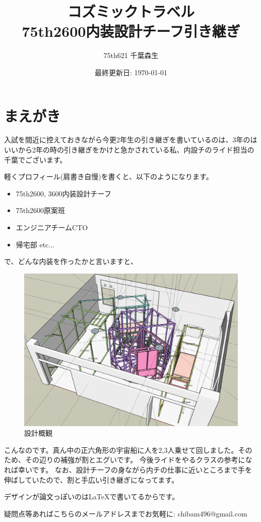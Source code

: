 \documentclass{jsarticle}
\title{
    コズミックトラベル \\
    \large 75th2600内装設計チーフ引き継ぎ
}
\author{75th621 千葉森生}
\date{最終更新日: \today}
\begin{document}
\maketitle

\section{まえがき}

入試を間近に控えておきながら今更2年生の引き継ぎを書いているのは、3年のはいいから2年の時の引き継ぎをかけと急かされている私、内設チのライド担当の千葉でございます。

軽くプロフィール(肩書き自慢)を書くと、以下のようになります。
\begin{itemize}
    \item 75th2600, 3600内装設計チーフ
    \item 75th2600原案班
    \item エンジニアチームCTO
    \item 帰宅部 etc...
\end{itemize}

で、どんな内装を作ったかと言いますと、

\begin{figure}[htbp]
    \centering
    \includegraphics[width=0.5\linewidth]{images/plan_overview/1.png}
    \caption{設計概観}
    \label{fig:設計概観}
\end{figure}

こんなのです。真ん中の正六角形の宇宙船に人を2,3人乗せて回しました。そのため、その辺りの補強が割とエグいです。
今後ライドをやるクラスの参考になれば幸いです。
なお、設計チーフの身ながら内チの仕事に近いところまで手を伸ばしていたので、割と手広い引き継ぎになってます。

デザインが論文っぽいのは\LaTeX{}で書いてるからです。

疑問点等あればこちらのメールアドレスまでお気軽に:  chibam496@gmail.com

\clearpage

\tableofcontents
\clearpage
\end{document}
